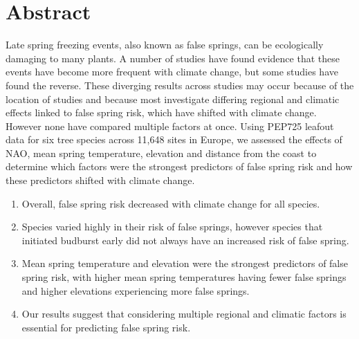 \documentclass{article}\usepackage[]{graphicx}\usepackage[]{color}
\begin{document}
\section*{Abstract}
Late spring freezing events, also known as false springs, can be ecologically damaging to many plants. A number of studies have found evidence that these events have become more frequent with climate change, but some studies have found the reverse. These diverging results across studies may occur because of the location of studies and because most investigate differing regional and climatic effects linked to false spring risk, which have shifted with climate change. However none have compared multiple factors at once. Using PEP725 leafout data for six tree species across 11,648 sites in Europe, we assessed the effects of NAO, mean spring temperature, elevation and distance from the coast to determine which factors were the strongest predictors of false spring risk and how these predictors shifted with climate change. 
  \begin{enumerate}
    \item Overall, false spring risk decreased with climate change for all species. %
        \item Species varied highly in their risk of false springs, however species that initiated budburst early did not always have an increased risk of false spring.
  \item Mean spring temperature and elevation were the strongest predictors of false spring risk, with higher mean spring temperatures having fewer false springs and higher elevations experiencing more false springs. %
  \item Our results suggest that considering multiple regional and climatic factors is essential for predicting false spring risk. %
  \end{enumerate}
\end{document}
